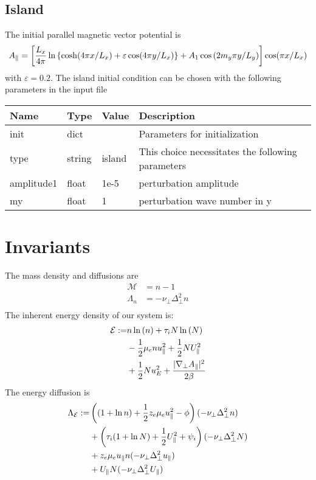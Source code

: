 \subsection{Island}
The initial parallel magnetic vector potential is
\begin{align}
    A_\parallel =\left[ \frac{L_x}{4\pi} \ln \left\{ \cosh( 4\pi x/L_x) + \varepsilon \cos( 4\pi y/L_x)\right\} + A_1\cos{(2m_y \pi y/L_y)}\right] \cos( \pi x /L_x)
\end{align}
with $\varepsilon = 0.2$.
The island initial condition can be chosen with the following parameters in the input file
\begin{longtable}{llll}
\toprule
\rowcolor{gray!50}\textbf{Name} &  \textbf{Type} & \textbf{Value}  & \textbf{Description}  \\ \midrule
init &  dict &   & Parameters for initialization \\
\qquad type      & string & island & This choice necessitates the following parameters \\
\qquad amplitude1  & float &  1e-5    &  perturbation amplitude \\
\qquad my          & float &  1       &  perturbation wave number in y\\
\bottomrule
\end{longtable}

\section{Invariants}
The mass density and diffusions are
\begin{align}
    \mathcal M &= n-1 \\
     \Lambda_n &= -\nu_\perp \Delta_\perp^2 n  \\
\end{align}
The inherent energy density of our system is:
\begin{align}
 \mathcal{E} := &
                    n  \ln{(\ensuremath{n })}
                  + \tau_i N \ln{( \ensuremath{N})}
                  \nonumber \\
                 &- \frac{1}{2} \mu_e n  u_\parallel^2
                  + \frac{1}{2} N U_\parallel^2
                  \nonumber \\
                 &+\frac{1}{2} N u_E^2
                  + \frac{|\nabla_\perp A_\parallel|^2}{2 \beta}
\end{align}
The energy diffusion is
\begin{align}
    \Lambda_\mathcal{E} :=  &\left( (1+\ln n ) + \frac{1}{2} z_e \mu_e u_\parallel^2 - \phi \right) (-\nu_\perp \Delta_\perp^2 n )
    \nonumber\\
    &+ \left( \tau_i ( 1+\ln N) + \frac{1}{2} U_\parallel^2 + \psi_i\right)(-\nu_\perp \Delta_\perp^2 N)
    \nonumber\\
    &+ z_e\mu_e u_\parallel n  (-\nu_\perp \Delta_\perp^2 u_\parallel)
    \nonumber\\
    &+ U_\parallel N (-\nu_\perp \Delta_\perp^2 U_\parallel)
\end{align}


